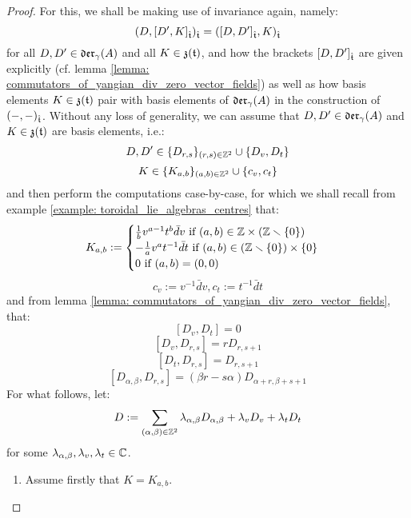             \begin{proof}
                For this, we shall be making use of invariance again, namely:
                    $$(D, [D', K]_{\hat{\mathfrak{t}}})_{\hat{\mathfrak{t}}} = ([D, D']_{\hat{\mathfrak{t}}}, K)_{\hat{\mathfrak{t}}}$$
                for all $D, D' \in \mathfrak{der}_{\gamma}(A)$ and all $K \in \mathfrak{z}(\mathfrak{t})$, and how the brackets $[D, D']_{\hat{\mathfrak{t}}}$ are given explicitly (cf. lemma \ref{lemma: commutators_of_yangian_div_zero_vector_fields}) as well as how basis elements $K \in \mathfrak{z}(\mathfrak{t})$ pair with basis elements of $\mathfrak{der}_{\gamma}(A)$ in the construction of $(-, -)_{\hat{\mathfrak{t}}}$. Without any loss of generality, we can assume that $D, D' \in \mathfrak{der}_{\gamma}(A)$ and $K \in \mathfrak{z}(\mathfrak{t})$ are basis elements, i.e.:
                    $$D, D' \in \{D_{r, s}\}_{(r, s) \in \mathbb{Z}^2} \cup \{D_v, D_t\}$$
                    $$K \in \{K_{a, b}\}_{(a, b) \in \mathbb{Z}^2} \cup \{c_v, c_t\}$$
                and then perform the computations case-by-case, for which we shall recall from example \ref{example: toroidal_lie_algebras_centres} that:
                    $$
                        K_{a, b} :=
                        \begin{cases}
                            \text{$\frac1b v^{a - 1} t^b \bar{d}v$ if $(a, b) \in \Z \x (\Z \setminus \{0\})$}
                            \\
                            \text{$-\frac1a v^a t^{-1} \bar{d}t$ if $(a, b) \in (\Z \setminus \{0\}) \x \{0\}$}
                            \\
                            \text{$0$ if $(a, b) = (0, 0)$}
                        \end{cases}
                    $$
                    $$c_v := v^{-1} \bar{d}v, c_t := t^{-1} \bar{d}t$$
                and from lemma \ref{lemma: commutators_of_yangian_div_zero_vector_fields}, that:
                    $$[D_v, D_t] = 0$$
                    $$[D_v, D_{r, s}] = r D_{r, s + 1}$$
                    $$[D_t, D_{r, s}] = D_{r, s + 1}$$
                    $$[D_{\alpha, \beta}, D_{r, s}] = (\beta r - s \alpha) D_{\alpha + r, \beta + s + 1}$$
                For what follows, let:
                    $$D := \sum_{(\alpha, \beta) \in \mathbb{Z}^2} \lambda_{\alpha, \beta} D_{\alpha, \beta} + \lambda_v D_v + \lambda_t D_t$$
                for some $\lambda_{\alpha, \beta}, \lambda_v, \lambda_t \in \mathbb{C}$.
                \begin{enumerate}
                    \item Assume firstly that $K = K_{a, b}$.
                    \begin{enumerate}

\end{enumerate}
\end{enumerate}
\end{proof}

